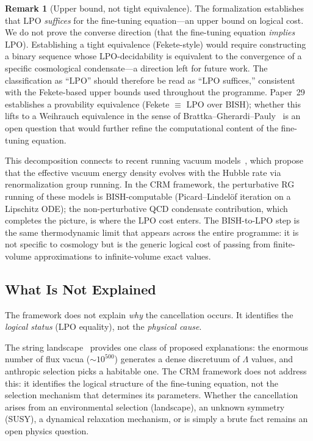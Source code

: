 \documentclass[11pt,a4paper]{article}
\theoremstyle{plain}
\theoremstyle{definition}
\newtheorem{remark}[theorem]{Remark}
\newcommand{\LPO}{\ensuremath{\mathrm{LPO}}}
\newcommand{\BISH}{\ensuremath{\mathrm{BISH}}}
\begin{document}
\begin{remark}[Upper bound, not tight equivalence]
The formalization establishes that $\LPO$ \emph{suffices} for
the fine-tuning equation---an upper bound on logical cost.
We do not prove the converse direction (that the fine-tuning
equation \emph{implies} $\LPO$).  Establishing a tight equivalence
(Fekete-style) would require constructing a binary sequence whose
$\LPO$-decidability is equivalent to the convergence of a specific
cosmological condensate---a direction left for future work.
The classification as ``$\LPO$'' should therefore be read as
``$\LPO$ suffices,'' consistent with the Fekete-based upper
bounds used throughout the programme.
Paper~29 establishes a provability equivalence (Fekete $\equiv$
$\LPO$ over $\BISH$); whether this lifts to a Weihrauch equivalence
in the sense of Brattka--Gherardi--Pauly~\cite{BrattkaEtAl2012}
is an open question that would further refine the computational
content of the fine-tuning equation.
\end{remark}

This decomposition connects to recent running vacuum
models~\cite{Sola2013}, which propose that the effective vacuum
energy density evolves with the Hubble rate via renormalization
group running.  In the CRM framework, the perturbative RG
running of these models is $\BISH$-computable (Picard--Lindel\"of
iteration on a Lipschitz ODE); the non-perturbative QCD condensate
contribution, which completes the picture, is where the $\LPO$
cost enters.  The BISH-to-LPO step is the same thermodynamic
limit that appears across the entire programme: it is not specific
to cosmology but is the generic logical cost of passing from
finite-volume approximations to infinite-volume exact values.

\subsection{What Is Not Explained}

The framework does not explain \emph{why} the cancellation occurs.
It identifies the \emph{logical status} ($\LPO$ equality), not the
\emph{physical cause}.

The string landscape~\cite{Polchinski2006,BoussoPolchinski2000}
provides one class of proposed explanations: the enormous number of
flux vacua (${\sim}10^{500}$) generates a dense discretuum of $\Lambda$
values, and anthropic selection picks a habitable one.  The CRM
framework does not address this: it identifies the logical structure
of the fine-tuning equation, not the selection mechanism that
determines its parameters.  Whether the cancellation arises from
an environmental selection (landscape), an unknown symmetry (SUSY),
a dynamical relaxation mechanism, or is simply a brute fact remains
an open physics question.
\end{document}
